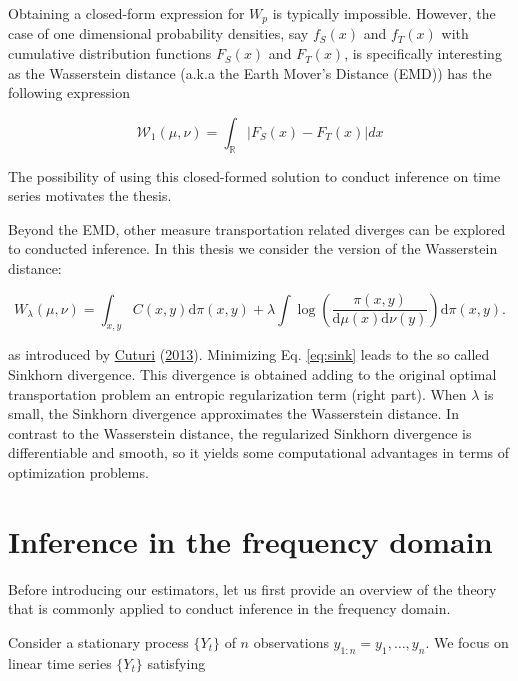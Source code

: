 \documentclass[
  11pt,
]{article}
\begin{document}
Obtaining a closed-form expression for \(W_{p}\) is typically
impossible. However, the case of one dimensional probability densities,
say \(f_{S}(x)\) and \(f_{T}(x)\) with cumulative distribution functions
\(F_{S}(x)\) and \(F_{T}(x)\), is specifically interesting as the
Wasserstein distance (a.k.a the Earth Mover's Distance (EMD)) has the
following expression

\begin{equation}
\mathcal{W}_{1}(\mu, \nu)=\int_{\mathbb{R}}\left|F_{S}(x)-F_{T}(x)\right| d x
\label{eq:wass_1}
\end{equation}

The possibility of using this closed-formed solution to conduct
inference on time series motivates the thesis.

Beyond the EMD, other measure transportation related diverges can be
explored to conducted inference. In this thesis we consider the version
of the Wasserstein distance:

\begin{equation}
W_{\lambda}(\mu, \nu) =\int_{x, y} C(x, y) \mathrm{d} \pi(x, y)+ \lambda \int \log \left(\frac{\pi(x, y)}{\mathrm{d} \mu(x) \mathrm{d} \nu(y)}\right) \mathrm{d} \pi(x, y). 
\label{eq:sink}
\end{equation}

as introduced by \protect\hyperlink{ref-cuturi2013sinkhorn}{Cuturi}
(\protect\hyperlink{ref-cuturi2013sinkhorn}{2013}). Minimizing Eq.
\ref{eq:sink} leads to the so called Sinkhorn divergence. This
divergence is obtained adding to the original optimal transportation
problem an entropic regularization term (right part). When \(\lambda\)
is small, the Sinkhorn divergence approximates the Wasserstein distance.
In contrast to the Wasserstein distance, the regularized Sinkhorn
divergence is differentiable and smooth, so it yields some computational
advantages in terms of optimization problems.

\hypertarget{inference-in-the-frequency-domain}{%
\section{Inference in the frequency
domain}\label{inference-in-the-frequency-domain}}

Before introducing our estimators, let us first provide an overview of
the theory that is commonly applied to conduct inference in the
frequency domain.

Consider a stationary process \(\{Y_t\}\) of \(n\) observations
\(y_{1:n} = y_1, … ,y_n\). We focus on linear time series \(\{Y_t\}\)
satisfying
\end{document}
